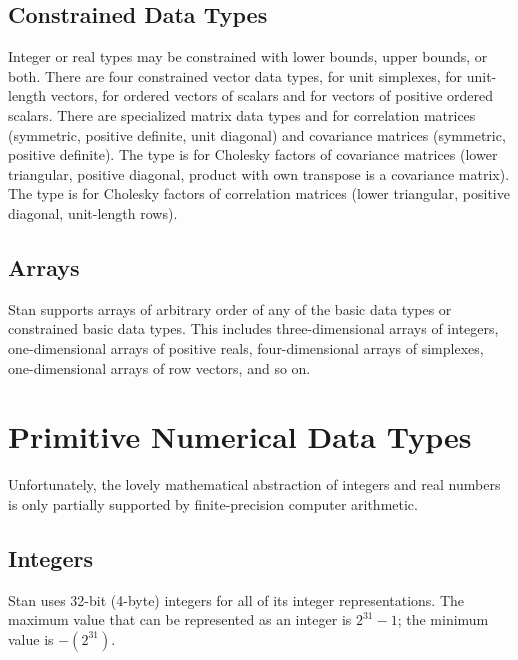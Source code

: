 \subsection{Constrained Data Types}

Integer or real types may be constrained with lower bounds, upper
bounds, or both.  There are four constrained vector data types,
 for unit simplexes,  for unit-length
vectors,  for ordered vectors of scalars and
 for vectors of positive ordered scalars.
There are specialized matrix data types  and
 for correlation matrices (symmetric, positive
definite, unit diagonal) and covariance matrices (symmetric, positive
definite).  The type  is for Cholesky
factors of covariance matrices (lower triangular, positive diagonal,
product with own transpose is a covariance matrix).  The type
 is for Cholesky factors of correlation
matrices (lower triangular, positive diagonal, unit-length rows).

\subsection{Arrays}

Stan supports arrays of arbitrary order of any of the basic data
types or constrained basic data types.  This includes
three-dimensional arrays of integers, one-dimensional arrays of
positive reals, four-dimensional arrays of simplexes, one-dimensional
arrays of row vectors, and so on.



\section{Primitive Numerical Data Types}\label{numerical-data-types.section}

Unfortunately, the lovely mathematical abstraction of integers and
real numbers is only partially supported by finite-precision computer
arithmetic.

\subsection{Integers}

Stan uses 32-bit (4-byte) integers for all of its integer
representations.  The maximum value that can be represented
as an integer is $2^{31}-1$; the minimum value is $-(2^{31})$.

